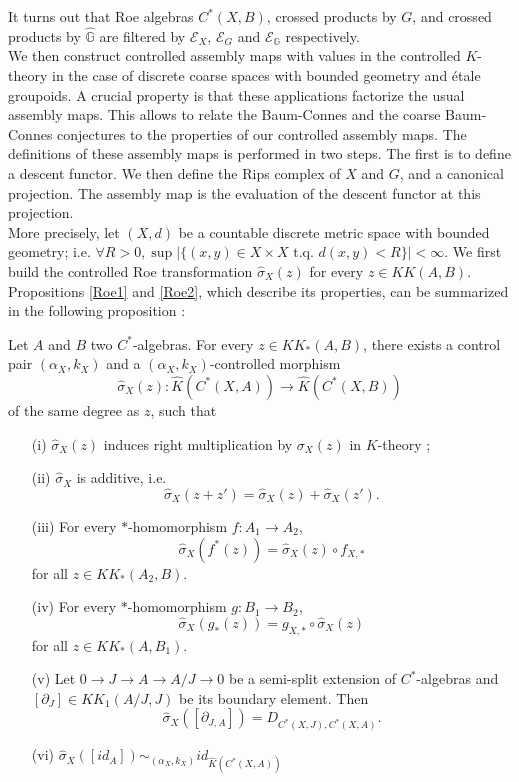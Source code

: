 It turns out that Roe algebras $C^*(X,B)$, crossed products by $G$, and crossed products by $\hat{\mathbb G}$ are filtered by $\mathcal E_X$, $\mathcal E_G$ and $\mathcal E_{\mathbb G}$ respectively.\\

We then construct controlled assembly maps with values in the controlled $K$-theory in the case of discrete coarse spaces with bounded geometry and étale groupoids. A crucial property is that these applications factorize the usual assembly maps. This allows to relate the Baum-Connes and the coarse Baum-Connes conjectures to the properties of our controlled assembly maps. The definitions of these assembly maps is performed in two steps. The first is to define a descent functor. We then define the Rips complex of $X$ and $G$, and a canonical projection. The assembly map is the evaluation of the descent functor at this projection. \\

More precisely, let $(X,d)$ be a countable discrete metric space with bounded geometry; i.e. $\forall R>0,\sup | \{ (x,y) \in X\times X \text{ t.q. }d(x,y)<R\} |<\infty$. We first build the controlled Roe transformation $\hat\sigma_X(z)$ for every $z\in KK(A,B)$. Propositions \ref{Roe1} and \ref{Roe2}, which describe its properties, can be summarized in the following proposition :

\begin{prop}
Let $A$ and $B$ two $C^*$-algebras. For every $z\in KK_*(A,B)$, there exists a control pair $(\alpha_X,k_X)$ and a $(\alpha_X,k_X)$-controlled morphism
\[\hat\sigma_X(z) : \hat K(C^*(X,A))\rightarrow \hat K(C^*(X,B))\]
of the same degree as $z$, such that
\begin{enumerate}
\item[(i)] $\hat\sigma_X(z)$ induces right multiplication by $\sigma_X(z)$ in $K$-theory ;
\item[(ii)] $\hat\sigma_X$ is additive, i.e.
\[\hat\sigma_X(z+z')=\hat\sigma_X(z)+\hat\sigma_X(z').\]
\item[(iii)] For every $*$-homomorphism $f : A_1\rightarrow A_2$,
\[\hat\sigma_X(f^*(z))=\hat\sigma_X(z)\circ f_{X,*}\] for all $z\in KK_*(A_2,B)$.
\item[(iv)] For every $*$-homomorphism $g : B_1\rightarrow B_2$,
\[\hat\sigma_X(g_*(z))= g_{X,*}\circ \hat\sigma_X(z)\] for all $z\in KK_*(A,B_1)$.
\item[(v)] Let $0\rightarrow J\rightarrow A\rightarrow A/J\rightarrow 0$ be a semi-split extension of $C^*$-algebras and $[\partial_J]\in KK_1(A/J,J)$ be its boundary element. Then 
\[\hat\sigma_X([\partial_{J,A}])=D_{C^*(X,J),C^*(X,A)}.\] 
\item[(vi)] $\hat\sigma_X([id_A]) \sim_{(\alpha_X,k_X)} id_{\hat K(C^*(X,A))}$
\end{enumerate}
\end{prop}

